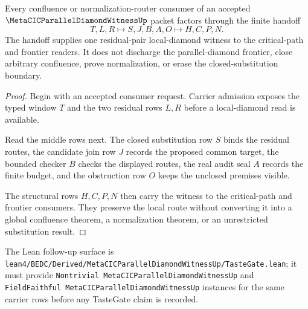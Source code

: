 \begin{theorem}
\label{thm:metacic-parallel-diamond-witness-handoff}
Every confluence or normalization-router consumer of an accepted $\MetaCICParallelDiamondWitnessUp$ packet factors through the finite handoff
$$
T,L,R \longmapsto S,J,B,A,O \longmapsto H,C,P,N .
$$
The handoff supplies one residual-pair local-diamond witness to the critical-path and frontier readers. It does not discharge the parallel-diamond frontier, close arbitrary confluence, prove normalization, or erase the closed-substitution boundary.
\end{theorem}
\begin{proof}
Begin with an accepted consumer request. Carrier admission exposes the typed window $T$ and the two residual rows $L,R$ before a local-diamond read is available.

Read the middle rows next. The closed substitution row $S$ binds the residual routes, the candidate join row $J$ records the proposed common target, the bounded checker $B$ checks the displayed routes, the real audit seal $A$ records the finite budget, and the obstruction row $O$ keeps the unclosed premises visible.

The structural rows $H,C,P,N$ then carry the witness to the critical-path and frontier consumers. They preserve the local route without converting it into a global confluence theorem, a normalization theorem, or an unrestricted substitution result.
\end{proof}



The Lean follow-up surface is \texttt{lean4/BEDC/Derived/MetaCICParallelDiamondWitnessUp/TasteGate.lean}; it must provide \texttt{Nontrivial MetaCICParallelDiamondWitnessUp} and \texttt{FieldFaithful MetaCICParallelDiamondWitnessUp} instances for the same carrier rows before any TasteGate claim is recorded.

